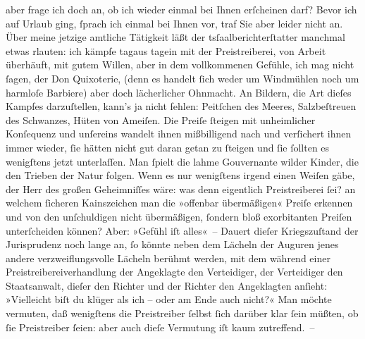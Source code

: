 \begin{ledgroupsized}[t]{13cm}
                    aber frage ich doch an, ob ich wieder einmal bei Ihnen erſcheinen darf? Bevor
                    ich auf Urlaub ging, ſprach ich einmal bei Ihnen vor, traf Sie aber leider nicht
                    an.\pend
           \pstart
           Über meine jetzige amtliche Tätigkeit läßt der tsſaalberichterſtatter manchmal etwas rlauten: ich kämpfe tagaus tagein mit der Preistreiberei, von Arbeit
                    überhäuft, mit gutem Willen, aber in dem vollkommenen Gefühle, ich mag nicht
                    ſagen, der Don Quixoterie,
                         (denn es handelt ſich weder um
                    Windmühlen noch um harmloſe Barbiere) aber doch lächerlicher Ohnmacht. An
                    Bildern, die Art dieſes Kampfes darzuſtellen, kann’s ja nicht fehlen: Peitſchen
                    des Meeres, Salzbeſtreuen des Schwanzes, Hüten von Ameiſen. Die Preiſe ſteigen
                    mit unheimlicher Konſequenz und unſereins wandelt ihnen mißbilligend nach {\pb}und verſichert ihnen immer wieder, ſie hätten
                    nicht gut daran getan zu ſteigen und ſie ſollten es wenigſtens jetzt
                    unterlaſſen. Man ſpielt die lahme Gouvernante wilder Kinder, die den Trieben der
                    Natur folgen. Wenn es nur wenigſtens irgend einen Weiſen gäbe, der Herr des
                    großen Geheimniſſes wäre: was denn eigentlich Preistreiberei ſei? an welchem
                    ſicheren Kainszeichen man die »offenbar übermäßigen« Preiſe erkennen und von den
                    unſchuldigen nicht übermäßigen, ſondern bloß exorbitanten Preiſen unterſcheiden
                    können? Aber: »Gefühl iſt alles« –\pend
           \pstart
           Dauert dieſer Kriegszuſtand der Jurisprudenz noch lange an, ſo könnte neben dem
                    Lächeln der Auguren jenes andere verzweiflungsvolle Lächeln berühmt werden, mit
                    dem während einer Preistreibereiverhandlung der Angeklagte den Verteidiger, der
                    Verteidiger den Staatsanwalt, dieſer den Richter und der Richter den Angeklagten
                    anſieht: »Vielleicht biſt du {\pb}klüger als ich –
                    oder am Ende auch nicht?« Man möchte vermuten, daß wenigſtens die Preistreiber
                        \introOben{}\introOben{}{ }ſelbst \introOben{}ſich\introOben{} darüber
                    klar ſein müßten, ob ſie Preistreiber ſeien: aber auch dieſe Vermutung iſt  kaum zutreffend. –\pend

\end{ledgroupsized}
